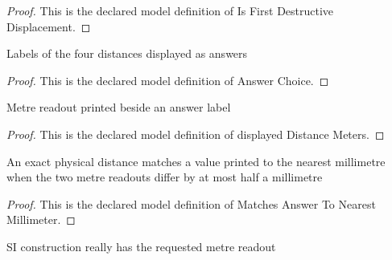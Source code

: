 \begin{proof}
  This is the declared model definition of Is First Destructive Displacement.
\end{proof}
\begin{definition}
  \label{def:physics:phyx-mini-0169:phyxminiproblems-problemphyxmini0169-answerchoice}
  Labels of the four distances displayed as answers
\end{definition}
\begin{proof}
  This is the declared model definition of Answer Choice.
\end{proof}
\begin{definition}
  \label{def:physics:phyx-mini-0169:phyxminiproblems-problemphyxmini0169-displayeddistancemeters}
  Metre readout printed beside an answer label
\end{definition}
\begin{proof}
  This is the declared model definition of displayed Distance Meters.
\end{proof}
\begin{definition}
  \label{def:physics:phyx-mini-0169:phyxminiproblems-problemphyxmini0169-matchesanswertonearestmillimeter}
  An exact physical distance matches a value printed to the nearest millimetre when the two metre readouts differ by at most half a millimetre
\end{definition}
\begin{proof}
  This is the declared model definition of Matches Answer To Nearest Millimeter.
\end{proof}
\begin{lemma}
  \label{lem:physics:phyx-mini-0169:phyxminiproblems-problemphyxmini0169-metersvalue-lengthinmeters}
  SI construction really has the requested metre readout
\end{lemma}
